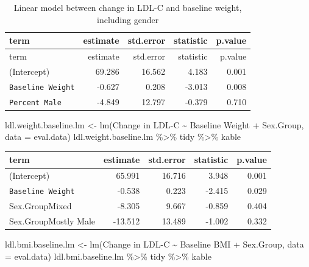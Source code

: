 \documentclass[
]{article}
\newenvironment{Shaded}{\begin{snugshade}}{\end{snugshade}}
\newcommand{\AttributeTok}[1]{\textcolor[rgb]{0.77,0.63,0.00}{#1}}
\newcommand{\FunctionTok}[1]{\textcolor[rgb]{0.00,0.00,0.00}{#1}}
\newcommand{\NormalTok}[1]{#1}
\newcommand{\OtherTok}[1]{\textcolor[rgb]{0.56,0.35,0.01}{#1}}
\newcommand{\SpecialCharTok}[1]{\textcolor[rgb]{0.00,0.00,0.00}{#1}}
\newcommand{\StringTok}[1]{\textcolor[rgb]{0.31,0.60,0.02}{#1}}
\begin{document}
\begin{longtable}[]{@{}lrrrr@{}}
\caption{Linear model between change in LDL-C and baseline weight,
including gender}\tabularnewline
\toprule
term & estimate & std.error & statistic & p.value \\
\midrule
\endfirsthead
\toprule
term & estimate & std.error & statistic & p.value \\
\midrule
\endhead
(Intercept) & 69.286 & 16.562 & 4.183 & 0.001 \\
\texttt{Baseline\ Weight} & -0.627 & 0.208 & -3.013 & 0.008 \\
\texttt{Percent\ Male} & -4.849 & 12.797 & -0.379 & 0.710 \\
\bottomrule
\end{longtable}

\begin{Shaded}
\begin{Highlighting}[]
\NormalTok{ldl.weight.baseline.lm }\OtherTok{\textless{}{-}} \FunctionTok{lm}\NormalTok{(}\StringTok{\textasciigrave{}}\AttributeTok{Change in LDL{-}C}\StringTok{\textasciigrave{}} \SpecialCharTok{\textasciitilde{}} \StringTok{\textasciigrave{}}\AttributeTok{Baseline Weight}\StringTok{\textasciigrave{}} \SpecialCharTok{+} \StringTok{\textasciigrave{}}\AttributeTok{Sex.Group}\StringTok{\textasciigrave{}}\NormalTok{, }\AttributeTok{data =}\NormalTok{ eval.data)}
\NormalTok{ldl.weight.baseline.lm }\SpecialCharTok{\%\textgreater{}\%}\NormalTok{ tidy }\SpecialCharTok{\%\textgreater{}\%}\NormalTok{ kable}
\end{Highlighting}
\end{Shaded}

\begin{longtable}[]{@{}lrrrr@{}}
\toprule
term & estimate & std.error & statistic & p.value \\
\midrule
\endhead
(Intercept) & 65.991 & 16.716 & 3.948 & 0.001 \\
\texttt{Baseline\ Weight} & -0.538 & 0.223 & -2.415 & 0.029 \\
Sex.GroupMixed & -8.305 & 9.667 & -0.859 & 0.404 \\
Sex.GroupMostly Male & -13.512 & 13.489 & -1.002 & 0.332 \\
\bottomrule
\end{longtable}

\begin{Shaded}
\begin{Highlighting}[]
\NormalTok{ldl.bmi.baseline.lm }\OtherTok{\textless{}{-}} \FunctionTok{lm}\NormalTok{(}\StringTok{\textasciigrave{}}\AttributeTok{Change in LDL{-}C}\StringTok{\textasciigrave{}} \SpecialCharTok{\textasciitilde{}} \StringTok{\textasciigrave{}}\AttributeTok{Baseline BMI}\StringTok{\textasciigrave{}} \SpecialCharTok{+} \StringTok{\textasciigrave{}}\AttributeTok{Sex.Group}\StringTok{\textasciigrave{}}\NormalTok{, }\AttributeTok{data =}\NormalTok{ eval.data)}
\NormalTok{ldl.bmi.baseline.lm }\SpecialCharTok{\%\textgreater{}\%}\NormalTok{ tidy }\SpecialCharTok{\%\textgreater{}\%}\NormalTok{ kable}
\end{Highlighting}
\end{Shaded}
\end{document}

